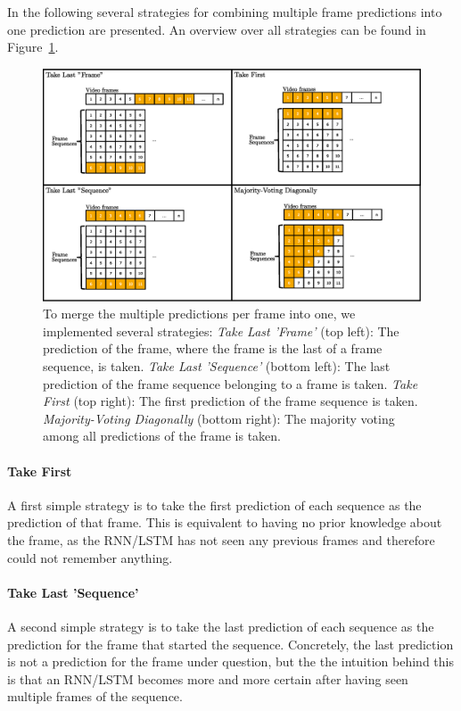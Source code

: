 In the following several strategies for combining multiple frame predictions into one prediction are presented.
An overview over all strategies can be found in Figure~\ref{fig:merging_strategies}.
\begin{figure}[!htb]
	\centering
	\includegraphics[scale=.5]{images/merging_strategies.eps}
	\caption{To merge the multiple predictions per frame into one, we implemented several strategies:
    \textit{Take Last 'Frame'} (top left): The prediction of the frame, where the frame is the last of a frame sequence, is taken.
    \textit{Take Last 'Sequence'} (bottom left): The last prediction of the frame sequence belonging to a frame is taken.
    \textit{Take First} (top right): The first prediction of the frame sequence is taken.
    \textit{Majority-Voting Diagonally} (bottom right): The majority voting among all predictions of the frame is taken.}
	\label{fig:merging_strategies}
\end{figure}
\paragraph{Take First}
A first simple strategy is to take the first prediction of each sequence as the prediction of that frame.
This is equivalent to having no prior knowledge about the frame, as the RNN/LSTM has not seen any previous frames and therefore could not remember anything.

\paragraph{Take Last 'Sequence'}
A second simple strategy is to take the last prediction of each sequence as the prediction for the frame that started the sequence.
Concretely, the last prediction is not a prediction for the frame under question, but the the intuition behind this is that an RNN/LSTM becomes more and more certain after having seen multiple frames of the sequence.

